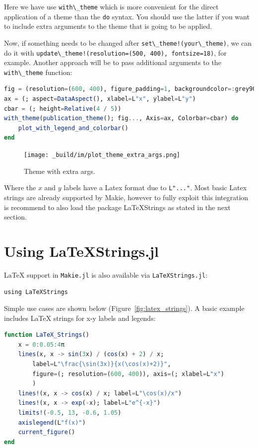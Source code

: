 \documentclass[
  notoc %
]{tufte-book}
\newcommand{\passthrough}[1]{#1}
\begin{document}
Here we have use \passthrough{\lstinline!with\_theme!} which is more
convenient for the direct application of a theme than the
\passthrough{\lstinline!do!} syntax. You should use the latter if you
want to include extra arguments to the theme that is going to be
applied.

Now, if something needs to be changed after
\passthrough{\lstinline"set\_theme!(your\_theme)"}, we can do it with
\passthrough{\lstinline"update\_theme!(resolution=(500, 400), fontsize=18)"},
for example. Another approach will be to pass additional arguments to
the \passthrough{\lstinline!with\_theme!} function:

\begin{lstlisting}[language=Julia]
fig = (resolution=(600, 400), figure_padding=1, backgroundcolor=:grey90)
ax = (; aspect=DataAspect(), xlabel=L"x", ylabel=L"y")
cbar = (; height=Relative(4 / 5))
with_theme(publication_theme(); fig..., Axis=ax, Colorbar=cbar) do
    plot_with_legend_and_colorbar()
end
\end{lstlisting}

\begin{figure}
\hypertarget{fig:plot_theme_extra_args}{%
\centering
\texttt{[image: \_build/im/plot\_theme\_extra\_args.png]}
\caption{Theme with extra args.}\label{fig:plot_theme_extra_args}
}
\end{figure}

Where the \(x\) and \(y\) labels have a Latex format due to
\passthrough{\lstinline!L"..."!}. Most basic Latex strings are already
supported by Makie, however to fully exploit this integration is
recommend to also load the package LaTeXStrings as stated in the next
section.

\hypertarget{using-latexstrings.jl}{%
\section{Using LaTeXStrings.jl}\label{using-latexstrings.jl}}

LaTeX support in \passthrough{\lstinline!Makie.jl!} is also available
via \passthrough{\lstinline!LaTeXStrings.jl!}:

\begin{lstlisting}
using LaTeXStrings
\end{lstlisting}

Simple use cases are shown below (Figure~\ref{fig:latex_strings}). A
basic example includes LaTeX strings for x-y labels and legends:

\begin{lstlisting}[language=Julia]
function LaTeX_Strings()
    x = 0:0.05:4π
    lines(x, x -> sin(3x) / (cos(x) + 2) / x;
        label=L"\frac{\sin(3x)}{x(\cos(x)+2)}",
        figure=(; resolution=(600, 400)), axis=(; xlabel=L"x")
        )
    lines!(x, x -> cos(x) / x; label=L"\cos(x)/x")
    lines!(x, x -> exp(-x); label=L"e^{-x}")
    limits!(-0.5, 13, -0.6, 1.05)
    axislegend(L"f(x)")
    current_figure()
end
\end{lstlisting}
\end{document}
